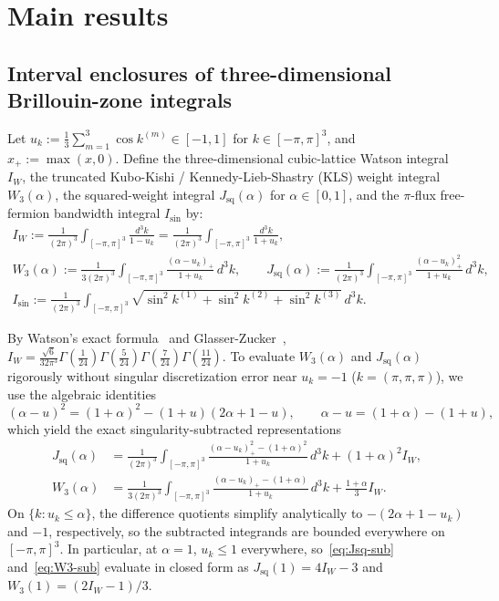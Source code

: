 \documentclass[11pt]{article}
\theoremstyle{definition}
\theoremstyle{remark}
\begin{document}
\section{Main results}\label{sec:results}

\subsection{Interval enclosures of three-dimensional Brillouin-zone integrals}\label{subsec:integrals}

Let $u_k := \frac{1}{3}\sum_{m=1}^3 \cos k^{(m)} \in [-1, 1]$ for $k \in [-\pi, \pi]^3$, and $x_+ := \max(x, 0)$. Define the three-dimensional cubic-lattice Watson integral $I_W$, the truncated Kubo-Kishi / Kennedy-Lieb-Shastry (KLS) weight integral $W_3(\alpha)$, the squared-weight integral $J_{\mathrm{sq}}(\alpha)$ for $\alpha \in [0, 1]$, and the $\pi$-flux free-fermion bandwidth integral $I_{\sin}$ by:
\begin{gather}
I_W := \frac{1}{(2\pi)^3}\int_{[-\pi,\pi]^3} \frac{d^3k}{1 - u_k} = \frac{1}{(2\pi)^3}\int_{[-\pi,\pi]^3} \frac{d^3k}{1 + u_k}, \label{eq:IW-def}\\
W_3(\alpha) := \frac{1}{3(2\pi)^3}\int_{[-\pi,\pi]^3} \frac{(\alpha - u_k)_+}{1 + u_k}\,d^3k, \qquad J_{\mathrm{sq}}(\alpha) := \frac{1}{(2\pi)^3}\int_{[-\pi,\pi]^3} \frac{(\alpha - u_k)_+^2}{1 + u_k}\,d^3k, \label{eq:W3-Jsq-def}\\
I_{\sin} := \frac{1}{(2\pi)^3}\int_{[-\pi,\pi]^3} \sqrt{\sin^2 k^{(1)} + \sin^2 k^{(2)} + \sin^2 k^{(3)}}\,d^3k. \label{eq:Isin-def}
\end{gather}

By Watson's exact formula~\cite{watson1939} and Glasser-Zucker~\cite{glasser1977}, $I_W = \frac{\sqrt{6}}{32\pi^3}\Gamma(\frac{1}{24})\Gamma(\frac{5}{24})\Gamma(\frac{7}{24})\Gamma(\frac{11}{24})$. To evaluate $W_3(\alpha)$ and $J_{\mathrm{sq}}(\alpha)$ rigorously without singular discretization error near $u_k = -1$ ($k = (\pi,\pi,\pi)$), we use the algebraic identities
\begin{equation*}
(\alpha - u)^2 = (1 + \alpha)^2 - (1 + u)(2\alpha + 1 - u), \qquad \alpha - u = (1 + \alpha) - (1 + u),
\end{equation*}
which yield the exact singularity-subtracted representations
\begin{align}
J_{\mathrm{sq}}(\alpha) &= \frac{1}{(2\pi)^3}\int_{[-\pi,\pi]^3} \frac{(\alpha - u_k)_+^2 - (1 + \alpha)^2}{1 + u_k}\,d^3k + (1 + \alpha)^2 I_W, \label{eq:Jsq-sub}\\
W_3(\alpha) &= \frac{1}{3(2\pi)^3}\int_{[-\pi,\pi]^3} \frac{(\alpha - u_k)_+ - (1 + \alpha)}{1 + u_k}\,d^3k + \frac{1 + \alpha}{3} I_W. \label{eq:W3-sub}
\end{align}
On $\{k : u_k \le \alpha\}$, the difference quotients simplify analytically to $-(2\alpha + 1 - u_k)$ and $-1$, respectively, so the subtracted integrands are bounded everywhere on $[-\pi,\pi]^3$. In particular, at $\alpha = 1$, $u_k \le 1$ everywhere, so~\eqref{eq:Jsq-sub} and~\eqref{eq:W3-sub} evaluate in closed form as $J_{\mathrm{sq}}(1) = 4I_W - 3$ and $W_3(1) = (2I_W - 1)/3$.
\end{document}
